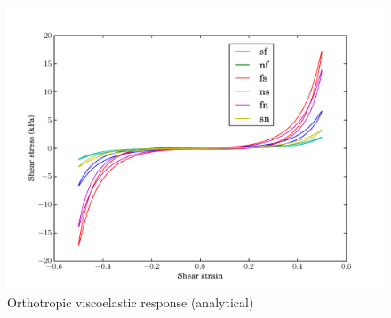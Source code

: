 \begin{figure}
  \centering
  \includegraphics[width=\textwidth]
                  {images/pdf/orthotropic-viscoelasticity}
  \caption{Orthotropic viscoelastic response (analytical)}
  \label{analytica-orthotropic-viscoelasticity}
\end{figure}

%

